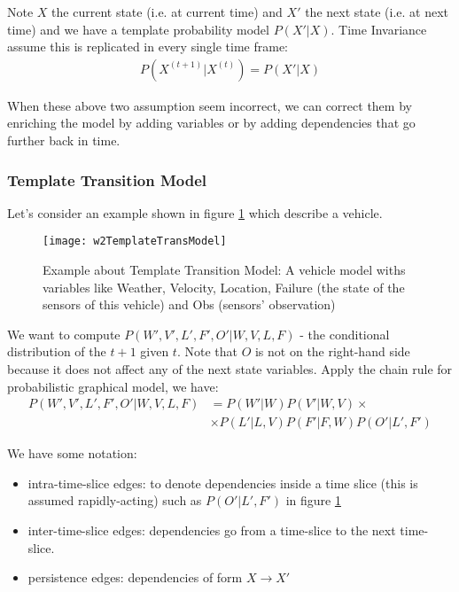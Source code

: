 \begin{defi}
Note $X$ the current state (i.e. at current time) and $X'$ the next state (i.e. at next time) and we have a template probability model $P(X'|X)$. Time Invariance assume this is replicated in every single time frame: 
\begin{align}
P(X^{(t+1)} | X^{(t)}) = P(X' | X)
\end{align}
\end{defi}

When these above two assumption seem incorrect, we can correct them by enriching the model by adding variables or by adding dependencies that go further back in time.

\subsubsection{Template Transition Model}
Let's consider an example shown in figure \ref{w2TemplateTransModel} which describe a vehicle. 
\begin{figure}[!ht]
	\centering
	\texttt{[image: w2TemplateTransModel]}
	\caption[Example about Template Transition Model]{Example about Template Transition Model: A vehicle model withs variables like Weather, Velocity, Location, Failure (the state of the sensors of this vehicle) and Obs (sensors' observation)}
	\label{w2TemplateTransModel}
\end{figure}

We want to compute $P(W',V',L',F',O'|W,V,L,F)$ - the conditional distribution of the $t+1$ given $t$. Note that $O$ is not on the right-hand side because it does not affect any of the next state variables. Apply the chain rule for probabilistic graphical model, we have:
\begin{align}
P(W',V',L',F',O'|W,V,L,F) &= P(W'|W) P(V'|W,V) \times \\ 
& \times P(L'|L,V) P(F'|F,W)  P(O'|L',F') \nonumber
\end{align}

We have some notation: 
\begin{itemize}
	\item intra-time-slice edges: to denote dependencies inside a time slice (this is assumed rapidly-acting) such as $P(O'|L',F')$ in figure \ref{w2TemplateTransModel}
	\item inter-time-slice edges: dependencies go from a time-slice to the next time-slice.
	\item persistence edges: dependencies of form $X \rightarrow X'$
\end{itemize}

